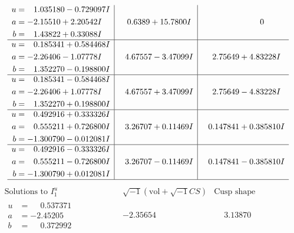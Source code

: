 \documentclass[1p]{elsarticle_modified}
\theoremstyle{definition}
\newcommand{\I}{\sqrt{-1}}
\begin{document}
$$\begin{array}{c|c|c}
\begin{aligned}
u &= \phantom{-}1.035180 - 0.729097 I \\
a &= -2.15510 + 2.20542 I \\
b &= \phantom{-}1.43822 + 0.33088 I\end{aligned}
 & \phantom{-}0.6389 + 15.7800 I & \phantom{-0.000000 } 0 \\ \hline\begin{aligned}
u &= \phantom{-}0.185341 + 0.584468 I \\
a &= -2.26406 - 1.07778 I \\
b &= \phantom{-}1.352270 - 0.198800 I\end{aligned}
 & \phantom{-}4.67557 - 3.47099 I & \phantom{-}2.75649 + 4.83228 I \\ \hline\begin{aligned}
u &= \phantom{-}0.185341 - 0.584468 I \\
a &= -2.26406 + 1.07778 I \\
b &= \phantom{-}1.352270 + 0.198800 I\end{aligned}
 & \phantom{-}4.67557 + 3.47099 I & \phantom{-}2.75649 - 4.83228 I \\ \hline\begin{aligned}
u &= \phantom{-}0.492916 + 0.333326 I \\
a &= \phantom{-}0.555211 + 0.726800 I \\
b &= -1.300790 - 0.012081 I\end{aligned}
 & \phantom{-}3.26707 + 0.11469 I & \phantom{-}0.147841 + 0.385810 I \\ \hline\begin{aligned}
u &= \phantom{-}0.492916 - 0.333326 I \\
a &= \phantom{-}0.555211 - 0.726800 I \\
b &= -1.300790 + 0.012081 I\end{aligned}
 & \phantom{-}3.26707 - 0.11469 I & \phantom{-}0.147841 - 0.385810 I\\
 \hline 
 \end{array}$$\newpage$$\begin{array}{c|c|c}  
\text{Solutions to }I^u_{1}& \I (\text{vol} + \sqrt{-1}CS) & \text{Cusp shape}\\
 \hline 
\begin{aligned}
u &= \phantom{-}0.537371\phantom{ +0.000000I} \\
a &= -2.45205\phantom{ +0.000000I} \\
b &= \phantom{-}0.372992\phantom{ +0.000000I}\end{aligned}
 & -2.35654\phantom{ +0.000000I} & \phantom{-}3.13870\phantom{ +0.000000I} \\ \hline\begin{aligned}

\end{aligned}
\end{array}$$
\end{document}
